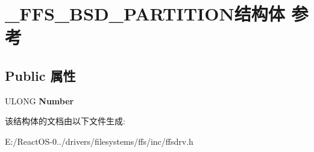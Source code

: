 \hypertarget{struct___f_f_s___b_s_d___p_a_r_t_i_t_i_o_n}{}\section{\+\_\+\+F\+F\+S\+\_\+\+B\+S\+D\+\_\+\+P\+A\+R\+T\+I\+T\+I\+O\+N结构体 参考}
\label{struct___f_f_s___b_s_d___p_a_r_t_i_t_i_o_n}
\subsection*{Public 属性}
\begin{DoxyCompactItemize}
\item 
\mbox{\label{struct___f_f_s___b_s_d___p_a_r_t_i_t_i_o_n_a037a058ffb49e449c6c0297c523ca57d}} 
U\+L\+O\+NG {\bfseries Number}
\end{DoxyCompactItemize}


该结构体的文档由以下文件生成\+:\begin{DoxyCompactItemize}
\item 
E\+:/\+React\+O\+S-\/0../drivers/filesystems/ffs/inc/ffsdrv.\+h\end{DoxyCompactItemize}
